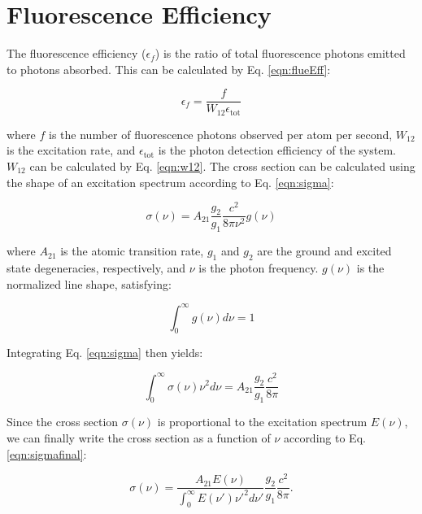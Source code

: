 

\section{Fluorescence Efficiency}
\label{sec:fluorEff}

The fluorescence efficiency ($\epsilon_{f}$) is the ratio of total fluorescence photons emitted to photons absorbed.  This can be calculated by Eq. \ref{eqn:flueEff}:

\begin{equation}
\epsilon_{f} = \frac{f}{W_{12} \epsilon_{\text{tot}}}
\label{eqn:flueEff}
\end{equation}

\noindent
where $f$ is the number of fluorescence photons observed per atom per second, $W_{12}$ is the excitation rate, and $\epsilon_{\text{tot}}$ is the photon detection efficiency of the system.  $W_{12}$ can be calculated by Eq. \ref{eqn:w12}.  The cross section can be calculated using the shape of an excitation spectrum according to Eq. \ref{eqn:sigma}:

\begin{equation}
\sigma(\nu) = A_{21} \frac{g_2}{g_1} \frac{c^2}{8 \pi \nu^2} g(\nu)
\label{eqn:sigma}
\end{equation}

\noindent
where $A_{21}$ is the atomic transition rate, $g_1$ and $g_2$ are the ground and excited state degeneracies, respectively, and $\nu$ is the photon frequency.  $g(\nu)$ is the normalized line shape, satisfying:

\begin{equation}
\int_{0}^{\infty} g(\nu) d\nu = 1
\label{eqn:g}
\end{equation}

\noindent
Integrating Eq. \ref{eqn:sigma} then yields:

\begin{equation}
\int_{0}^{\infty} \sigma(\nu) \nu^2 d\nu = A_{21} \frac{g_2}{g_1} \frac{c^2}{8 \pi}
\label{eqn:sigma2}
\end{equation}

\noindent
Since the cross section $\sigma(\nu)$ is proportional to the excitation spectrum $E(\nu)$, we can finally write the cross section as a function of $\nu$ according to Eq. \ref{eqn:sigmafinal}:

\begin{equation}
\sigma(\nu) = \frac{A_{21} E(\nu)}{\int_{0}^{\infty} E(\nu') \nu'^2 d\nu'} \frac{g_2}{g_1} \frac{c^2}{8 \pi}.
\label{eqn:sigmafinal}
\end{equation}